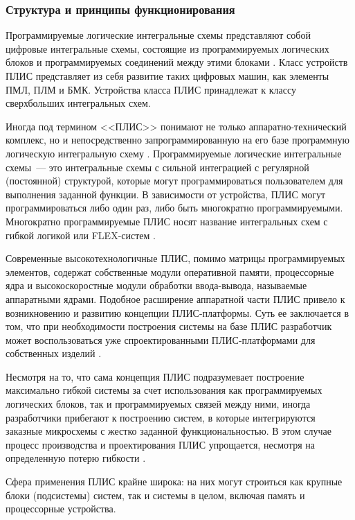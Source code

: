 \subsubsection{Структура и принципы функционирования} \label{sec:characteristics:structure}

Программируемые логические интегральные схемы представляют собой цифровые интегральные схемы, состоящие из программируемых логических блоков и программируемых соединений между этими блоками \cite[c.~18]{maxfield}.
Класс устройств ПЛИС представляет из себя развитие таких цифровых машин, как элементы ПМЛ, ПЛМ и БМК.
Устройства класса ПЛИС принадлежат к классу сверхбольших интегральных схем.

Иногда под термином <<ПЛИС>> понимают не только аппаратно-технический комплекс, но и непосредственно запрограммированную на его базе программную логическую интегральную схему \cite[c.~16]{popov}.
Программируемые логические интегральные схемы~--- это интегральные схемы с сильной интеграцией с регулярной (постоянной) структурой, которые могут программироваться пользователем для выполнения заданной функции.
В зависимости от устройства, ПЛИС могут программироваться либо один раз, либо быть многократно программируемыми.
Многократно программируемые ПЛИС носят название интегральных схем с гибкой логикой или FLEX-систем \cite[c.~15]{butaev}.

Современные высокотехнологичные ПЛИС, помимо матрицы программируемых элементов, содержат собственные модули оперативной памяти, процессорные ядра и высокоскоростные модули обработки ввода-вывода, называемые аппаратными ядрами.
Подобное расширение аппаратной части ПЛИС привело к возникновению и развитию концепции ПЛИС-платформы.
Суть ее заключается в том, что при необходимости построения системы на базе ПЛИС разработчик может воспользоваться уже спроектированными ПЛИС-платформами для собственных изделий \cite[c.~425]{ugryumov}.

Несмотря на то, что сама концепция ПЛИС подразумевает построение максимально гибкой системы за счет использования как программируемых логических блоков, так и программируемых связей между ними, иногда разработчики прибегают к построению систем, в которые интегрируются заказные микросхемы с жестко заданной функциональностью.
В этом случае процесс производства и проектирования ПЛИС упрощается, несмотря на определенную потерю гибкости \cite[c.~57-58]{maxfield}.

Сфера применения ПЛИС крайне широка: на них могут строиться как крупные блоки (подсистемы) систем, так и системы в целом, включая память и процессорные устройства.

